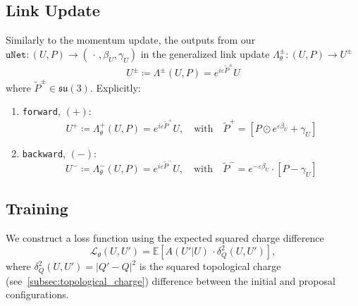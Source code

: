 \documentclass[a4paper,11pt]{article}
\begin{document}
\subsection{\label{subsec:gauge-update}Link Update}
%
Similarly to the momentum update, the outputs from our $\texttt{uNet}: (U, P) \rightarrow \left(\, \cdot\,, \beta_{U}, \gamma_{U}\right)$ in the generalized link update $\Lambda^{\pm}_{\theta}: (U, P) \rightarrow U^{\pm}$
%
\begin{equation}
  U^{\pm} \coloneqq \Lambda^{\pm}(U, P) = e^{i\varepsilon \tilde{P}^{\pm}} U
\end{equation}
%
where $\tilde{P}^{\pm} \in \mathfrak{su(3)}$. Explicitly:
\begin{enumerate}
\item \texttt{forward}, $(+)$:
    \begin{equation}
        U^{+} \coloneqq \Lambda^{+}_{\theta}(U, P) = e^{i\varepsilon \tilde{P}^{+}} U, \quad \text{with}\quad \tilde{P}^{+} = \left[P\odot e^{\varepsilon \beta_{U}} + \gamma_{U}\right]
    \end{equation}
%
\item \texttt{backward}, $(-)$:
%
    \begin{equation}
        U^{-} \coloneqq \Lambda^{-}_{\theta}(U, P) = e^{i\varepsilon \tilde{P}^{-}} U, \quad \text{with}\quad \tilde{P}^{-} = e^{-\varepsilon \beta_{U}} \cdot \left[P - \gamma_{U} \right] 
    \end{equation}
%
\end{enumerate}
%
\subsection{\label{subsec:training}Training}
%
We construct a loss function using the expected squared charge
difference
%
\begin{equation}
    \mathcal{L}_{\theta}(U, U') = \mathbb{E}\left[A(U'|U)\,\cdot \delta^{2}_{Q}(U, U')\right],
\end{equation}
%
where $\delta^{2}_{Q}(U, U')= |Q' - Q|^{2}$ is the squared topological
charge (see~\ref{subsec:topological_charge}) difference between the initial and proposal configurations.
\end{document}
